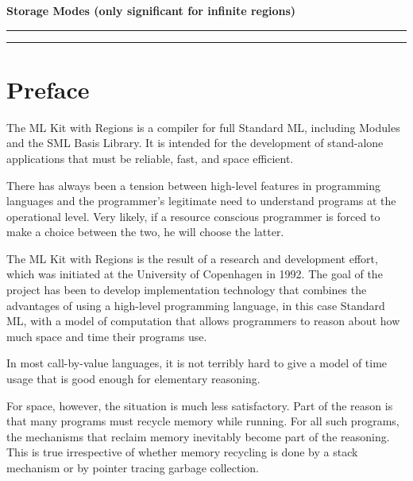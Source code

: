 \documentclass[12pt]{book}
\begin{document}
\begin{center}
\bf Storage Modes (only significant for infinite regions)
\end{center}
\smallskip

\hrule
{}
\hrule
\medskip
               
\tableofcontents
\chapter*{Preface}
The ML Kit with Regions is a compiler for full
%
Standard ML, including Modules and the SML Basis Library.  It is
intended for the development of stand-alone applications that must be
reliable, fast, and space efficient.

There has always been a tension between high-level features in
programming languages and the programmer's legitimate need to
understand programs at the operational level. Very likely, if a
resource conscious programmer is forced to make a choice between the
two, he will choose the latter.

The ML Kit with Regions is the result of a research and development
effort, which was initiated at the University of Copenhagen in 1992.
The goal of the project has been to develop implementation technology
that combines the advantages of using a high-level programming
language, in this case Standard ML, with a model of computation that
allows programmers to reason about how much space and time their
programs use.

In most call-by-value languages, it is not terribly hard to give a
model of time usage that is good enough for elementary reasoning. 

For space, however, the situation is much less satisfactory. Part of
the reason is that many programs must recycle memory while running.
For all such programs, the mechanisms that reclaim memory inevitably
become part of the reasoning.  This is true irrespective of whether
memory recycling is done by a
% 
stack mechanism or by pointer tracing garbage collection.
\end{document}
